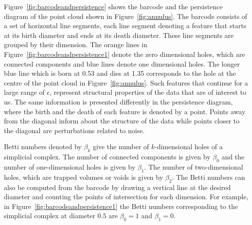\documentclass[letter,12pt]{article}
\begin{document}
Figure~\ref{fig:barcodeandpersistence} shows the barcode and the persistence diagram of the point cloud shown in Figure~\ref{fig:annulus}. The barcode consists of a set of horizontal line segments, each line segment denoting a feature that starts at its birth diameter and ends at its death diameter. These line segments are grouped by their dimension. The orange lines in Figure~\ref{fig:barcodeandpersistence1} denote the zero dimensional holes, which are connected components and blue lines denote one dimensional holes. The longer blue line which is born at  0.53 and dies at 1.35 corresponds to the hole at the centre of the point cloud in Figure~\ref{fig:annulus}. Such features that continue for a large range of $\epsilon$, represent  structural properties of the data that are of interest to us. The same information is presented differently in the persistence diagram, where the birth and the death of each feature is denoted by a point. Points away from the diagonal inform about the structure of the data while points closer to the diagonal are perturbations related to noise. 

Betti numbers denoted by $\beta_k$ give the number of $k$-dimensional holes of a  simplicial complex. The number of connected components is given by $\beta_0$ and the number of one-dimensional holes is given by $\beta_1$. The number of two-dimensional holes, which are trapped volumes or voids is given by $\beta_2$. The Betti numbers can also be computed from the barcode by drawing a vertical line at the desired diameter and counting the points of intersection for each dimension. For example, in Figure~\ref{fig:barcodeandpersistence1} the Betti numbers corresponding to the simplicial complex at diameter $0.5$ are $\beta_0 = 1$ and $\beta_1 = 0$.  
\end{document}
